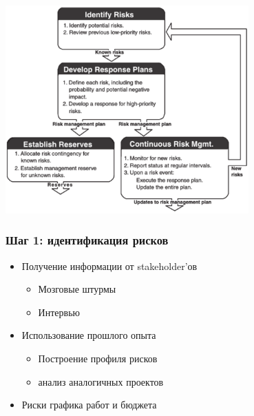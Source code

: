\documentclass{../../slides-style}
\begin{document}
    \begin{frame}
        \begin{center}
            \includegraphics[width=0.7\textwidth]{riskManagementLoop.png}
        \end{center}
    \end{frame}

    \begin{frame}
        \frametitle{Шаг 1: идентификация рисков}
        \begin{itemize}
            \item Получение информации от stakeholder’ов
            \begin{itemize}
                \item Мозговые штурмы
                \item Интервью
            \end{itemize}
            \item Использование прошлого опыта
            \begin{itemize}
                \item Построение профиля рисков
                \item анализ аналогичных проектов
            \end{itemize}
            \item Риски графика работ и бюджета
        \end{itemize}
    \end{frame}
\end{document}
